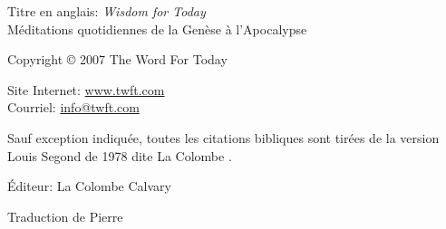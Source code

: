 \newpage
\mbox{}
\vfill
\noindent Titre en anglais\space: \emph{Wisdom for Today}\\
Méditations quotidiennes de la Genèse à l'Apocalypse

\noindent Copyright \copyright{} 2007 The Word For Today

\noindent Site Internet: \url{www.twft.com}\\
\noindent Courriel: \url{info@twft.com}

\noindent Sauf exception indiquée, toutes les citations bibliques sont tirées de
 la version Louis Segond de 1978 dite \og La Colombe \fg{}.


\noindent Éditeur\space: La Colombe Calvary

\noindent Traduction de Pierre 

